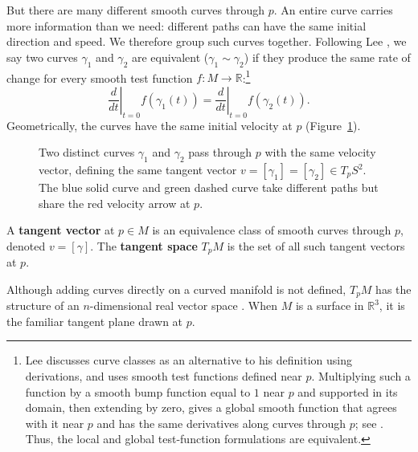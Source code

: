     But there are many different smooth curves through $p$. An entire curve
    carries more
    information than we need: different paths can have the same initial
    direction and speed. We therefore group such curves together.
    Following Lee \cite[p.~72]{lee2013smooth}, we say two curves $\gamma_1$ and
    $\gamma_2$ are equivalent ($\gamma_1\sim\gamma_2$) if they produce the same
    rate of change for every smooth test function
    $f\colon M\to\mathbb{R}$:\footnote{%
        Lee discusses curve classes as an alternative to his definition using
        derivations, and uses smooth test functions defined near $p$.
        Multiplying such a function by a smooth bump function equal to $1$
        near $p$ and supported in its domain, then extending by zero, gives a
        global smooth function that agrees with it near $p$ and has the same
        derivatives along curves through $p$; see
        \cite[Proposition~2.25]{lee2013smooth}. Thus, the local and global
        test-function formulations are equivalent.}
    \begin{equation}
        \left.\frac{d}{dt}\right|_{t=0}f(\gamma_1(t))
        =\left.\frac{d}{dt}\right|_{t=0}f(\gamma_2(t)).
    \end{equation}
    Geometrically, the curves have the same initial velocity at $p$
    (Figure~\ref{fig:sphere_tangent}).

    \begin{figure}[!ht]
        \centering
        
        \caption{%
            Two distinct curves $\gamma_1$ and $\gamma_2$ pass through $p$
            with the same velocity vector, defining the same tangent vector
            $v=[\gamma_1]=[\gamma_2]\in T_pS^2$. The blue solid curve and
            green dashed curve take different paths but share the red
            velocity arrow at $p$.
        }
        \label{fig:sphere_tangent}
    \end{figure}

    \begin{definition}
        A \textbf{tangent vector} at $p\in M$ is an equivalence class of smooth
        curves through $p$, denoted $v=[\gamma]$. The \textbf{tangent space}
        $T_pM$ is the set of all such tangent vectors at $p$.
    \end{definition}

    Although adding curves directly on a curved manifold is not defined,
    $T_pM$ has the structure of an $n$-dimensional real vector space
    \cite[Problem~3-8, p.~76; Proposition~3.10, p.~57]{lee2013smooth}.
    When $M$ is a surface in $\mathbb{R}^3$, it is the familiar tangent plane
    drawn at $p$.

